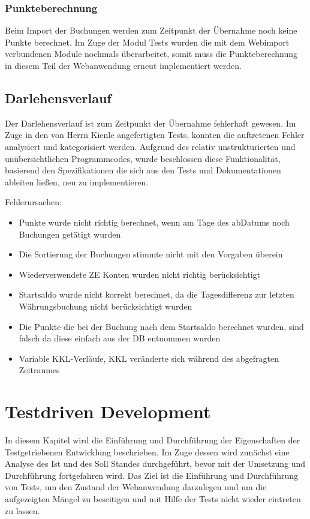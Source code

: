 \documentclass[12pt,             %
               a4paper,          %
               listof=totoc,     %
               index=totoc,      %
               bibliography=totoc,%
               oneside,         %
               BCOR1cm,          %
               english   %
               ]{scrbook}
\begin{document}
\subsection{Punkteberechnung}
Beim Import der Buchungen werden zum Zeitpunkt der Übernahme noch keine Punkte berechnet. Im Zuge der Modul Tests wurden die mit dem Webimport verbundenen Module nochmals überarbeitet, somit muss die Punkteberechnung in diesem Teil der Webanwendung erneut implementiert werden.


\section{Darlehensverlauf}
Der Darlehensverlauf ist zum Zeitpunkt der Übernahme fehlerhaft gewesen. Im Zuge in den von Herrn Kienle angefertigten Tests, konnten die auftretenen Fehler analysiert und kategorisiert werden. Aufgrund des relativ unstrukturierten und unübersichtlichen Programmcodes, wurde beschlossen diese Funktionalität, basierend den Spezifikationen die sich aus den Tests und Dokumentationen ableiten ließen, neu zu implementieren.

Fehlerursachen:

\begin{itemize}
     \item{Punkte wurde nicht richtig berechnet, wenn am Tage des abDatums noch Buchungen getätigt wurden}
     \item{Die Sortierung der Buchungen stimmte nicht mit den Vorgaben überein}
     \item{Wiederverwendete ZE Konten wurden nicht richtig berücksichtigt}
     \item{Startsaldo wurde nicht korrekt berechnet, da die Tagesdifferenz zur letzten Währungsbuchung nicht berücksichtigt wurden}
     \item{Die Punkte die bei der Buchung nach dem Startsaldo berechnet wurden, sind falsch da diese einfach aus der DB entnommen wurden}
     \item{Variable KKL-Verläufe, KKL veränderte sich während des abgefragten Zeitraumes}
\end{itemize} 



\clearpage
\chapter{Testdriven Development}
In diesem Kapitel wird die Einführung und Durchführung der Eigenschaften der Testgetriebenen Entwicklung beschrieben. Im Zuge dessen wird zunächst eine Analyse des Ist und des Soll Standes durchgeführt, bevor mit der Umsetzung und Durchführung fortgefahren wird. Das Ziel ist die Einführung und Durchführung von Tests, um den Zustand der Webanwendung darzulegen und um die aufgezeigten Mängel zu beseitigen und mit Hilfe der Tests nicht wieder eintreten zu lassen.    
\end{document}
